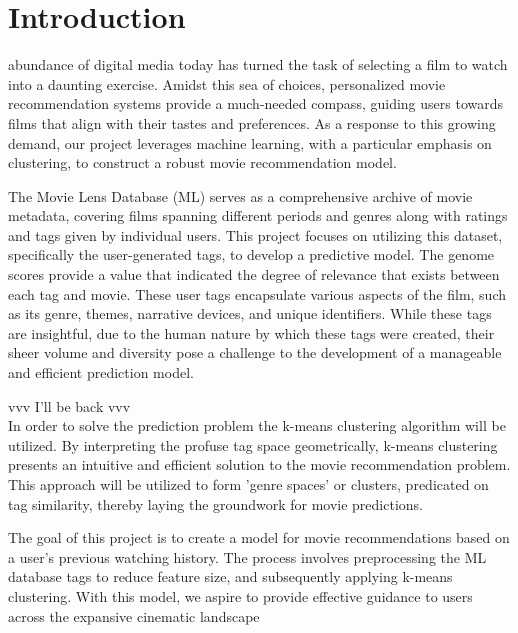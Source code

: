 \section{Introduction} 
 abundance of digital media today has turned the task of selecting a film to watch into a daunting exercise. Amidst this sea of choices, personalized movie recommendation systems provide a much-needed compass, guiding users towards films that align with their tastes and preferences. As a response to this growing demand, our project leverages machine learning, with a particular emphasis on clustering, to construct a robust movie recommendation model.

The Movie Lens Database (ML) serves as a comprehensive archive of movie metadata, covering films spanning different periods and genres along with ratings and tags given by individual users. This project focuses on utilizing this dataset, specifically the user-generated tags, to develop a predictive model. The genome scores provide a value that indicated the degree of relevance that exists between each tag and movie. These user tags encapsulate various aspects of the film, such as its genre, themes, narrative devices, and unique identifiers. While these tags are insightful, due to the human nature by which these tags were created, their sheer volume and diversity pose a challenge to the development of a manageable and efficient prediction model.

{\color{red}vvv I'll be back vvv}\\
In order to solve the prediction problem the k-means clustering algorithm will be utilized. By interpreting the profuse tag space geometrically, k-means clustering presents an intuitive and efficient solution to the movie recommendation problem. This approach will be utilized to form 'genre spaces' or clusters, predicated on tag similarity, thereby laying the groundwork for movie predictions.

The goal of this project is to create a model for movie recommendations based on a user's previous watching history. The process involves preprocessing the ML database tags to reduce feature size, and subsequently applying k-means clustering. With this model, we aspire to provide effective guidance to users across the expansive cinematic landscape

